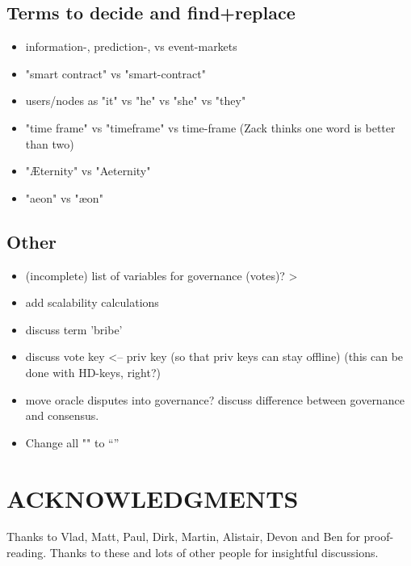 \documentclass[a4paper, 10pt, conference]{ieeeconf}      %
\begin{document}
\subsection{Terms to decide and find+replace}

\begin{itemize} 
   \item information-, prediction-, vs event-markets
   \item "smart contract" vs "smart-contract"
   \item users/nodes as "it" vs "he" vs "she" vs "they"
   \item "time frame" vs "timeframe" vs time-frame (Zack thinks one word is better than two)
   \item "Æternity" vs "Aeternity"
   \item "aeon" vs "æon"
\end{itemize}

\subsection{Other}
\begin{itemize}
\item (incomplete) list of variables for governance (votes)? > 
\item add scalability calculations
\item discuss term 'bribe'
\item discuss vote key <-- priv key (so that priv keys can stay offline) (this can be done with HD-keys, right?)
\item move oracle disputes into governance? discuss difference between governance and consensus. 
\item Change all "" to ``''
\end{itemize}

\fi




\section*{ACKNOWLEDGMENTS}
Thanks to Vlad, Matt, Paul, Dirk, Martin, Alistair, Devon and Ben for proof-reading. Thanks to these and lots of other people for insightful discussions.

%
%

%
\printbibliography
\end{document}
